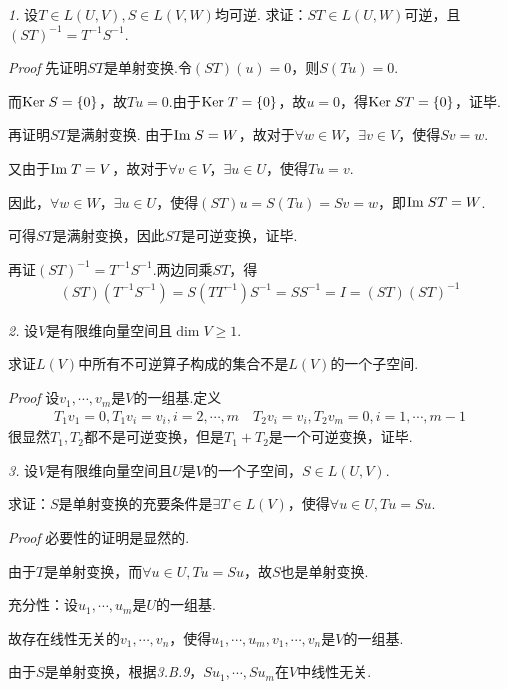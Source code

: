 \textit{1.}
设\(T \in L(U,V),S \in L(V,W)\)均可逆.
求证：\(ST \in L(U,W)\)可逆，且\((ST)^{-1}=T^{-1}S^{-1}\).

\textit{Proof}
先证明\(ST\)是单射变换.令\((ST)(u)=0\)，则\(S(Tu)=0\).

而\(\mathrm{Ker \;} S=\{0\}\)，故\(Tu=0\).由于\(\mathrm{Ker \;} T=\{0\}\)，故\(u=0\)，得\(\mathrm{Ker \;} ST=\{0\}\)，证毕.

再证明\(ST\)是满射变换.
由于\(\mathrm{Im \;} S=W\)，故对于\(\forall w \in W\)，\(\exists v \in V\)，使得\(Sv=w\).

又由于\(\mathrm{Im \;} T=V\)，故对于\(\forall v \in V\)，\(\exists u \in U\)，使得\(Tu=v\).

因此，\(\forall w \in W\)，\(\exists u \in U\)，使得\((ST)u=S(Tu)=Sv=w\)，即\(\mathrm{Im \;} ST=W\).

可得\(ST\)是满射变换，因此\(ST\)是可逆变换，证毕.

再证\((ST)^{-1}=T^{-1}S^{-1}\).两边同乘\(ST\)，得
    \begin{align*}
        (ST)(T^{-1}S^{-1})=S(TT^{-1})S^{-1}=SS^{-1}=I=(ST)(ST)^{-1}
    \end{align*}

\hspace*{\fill}

\textit{2.}
设\(V\)是有限维向量空间且\(\dim V \geq 1\).

求证\(L(V)\)中所有不可逆算子构成的集合不是\(L(V)\)的一个子空间.

\textit{Proof}
设\(v_1,\cdots,v_m\)是\(V\)的一组基.定义
    \begin{align*}
        T_1v_1=0,T_1v_i=v_i,i=2,\cdots,m \quad
        T_2v_i=v_i,T_2v_m=0,i=1,\cdots,m-1
    \end{align*}
很显然\(T_1,T_2\)都不是可逆变换，但是\(T_1+T_2\)是一个可逆变换，证毕.

\hspace*{\fill}

\textit{3.}
设\(V\)是有限维向量空间且\(U\)是\(V\)的一个子空间，\(S \in L(U,V)\).

求证：\(S\)是单射变换的充要条件是\(\exists T \in L(V)\)，使得\(\forall u \in U,Tu=Su\).

\textit{Proof}
必要性的证明是显然的.

由于\(T\)是单射变换，而\(\forall u \in U,Tu=Su\)，故\(S\)也是单射变换.

充分性：设\(u_1,\cdots,u_m\)是\(U\)的一组基.

故存在线性无关的\(v_1,\cdots,v_n\)，使得\(u_1,\cdots,u_m,v_1,\cdots,v_n\)是\(V\)的一组基.

由于\(S\)是单射变换，根据\textit{3.B.9}，\(Su_1,\cdots,Su_m\)在\(V\)中线性无关.


